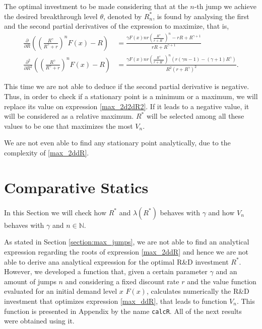 The optimal investment to be made considering that at the $n$-th jump we achieve the desired breakthrough level $\theta$, denoted by $R^*_n$, is found by analysing the first and the second partial derivatives of the expression to maximize, that is,
\begin{align}
\frac{\partial}{\partial R} \left( \left( \frac{R^\gamma}{R^\gamma+r}\right)^n F(x)-R \right) &= \frac{\gamma  F(x) n r \left(\frac{R^{\gamma }}{r+R^{\gamma }}\right)^n-r R+R^{\gamma +1}}{r R+R^{\gamma +1}} \label{max_2ddR}\\
\frac{\partial^2}{\partial R^2} \left( \left( \frac{R^\gamma}{R^\gamma+r}\right)^n F(x)-R\right) &=
\frac{\gamma  F(x) n r \left(\frac{R^{\gamma }}{r+R^{\gamma }}\right)^n \left(r (\gamma  n-1)-(\gamma +1) R^{\gamma }\right)}{R^2 \left(r+R^{\gamma }\right)^2}.
\label{max_2d2dR2}
\end{align}

This time we are not able to deduce if the second partial derivative is negative. Thus, in order to check if a stationary point is a minimum or a maximum, we will replace its value on expression \eqref{max_2d2dR2}. If it leads to a negative value, it will be considered as a relative maximum. $R^*$ will be selected among all these values to be one that maximizes the most $V_n$.

We are not even able to find any stationary point analytically, due to the complexity of \eqref{max_2ddR}.













\section{Comparative Statics}

In this Section we will check how $R^*$ and $\lambda(R^*)$ behaves with $\gamma$ and how $V_n$ behaves with $\gamma$ and $n \in \mathds{N}$.

As stated in Section \ref{section:max_jumps}, we are not able to find an analytical expression regarding the roots of expression \eqref{max_2ddR} and hence we are not able to derive ana analytical expression for the optimal R\&D investment $R^*$. However, we developed a function that, given a certain parameter $\gamma$ and an amount of jumps $n$ and considering a fixed discount rate $r$ and the value function evaluated for an initial demand level $x$ $F(x)$, calculates numerically the R\&D investment that optimizes expression \eqref{max_ddR}, that leads to function $V_n$. This function is presented in Appendix by the name \texttt{calcR}. All of the next results were obtained using it.

